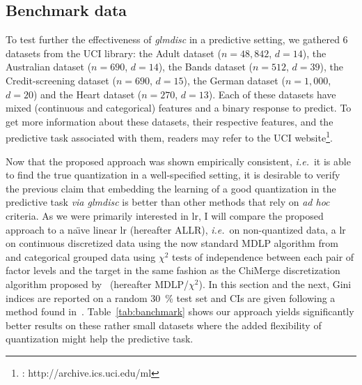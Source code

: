 \subsection{Benchmark data} \label{subsec:exp_benchmark}

To test further the effectiveness of \textit{glmdisc} in a predictive setting, we gathered 6 datasets from the UCI library: the Adult dataset ($n=48,842$, $d=14$), the Australian dataset ($n=690$, $d=14$), the Bands dataset ($n=512$, $d=39$), the Credit-screening dataset ($n=690$, $d=15$), the German dataset ($n=1,000$, $d=20$) and the Heart dataset ($n=270$, $d=13$). Each of these datasets have mixed (continuous and categorical) features and a binary response to predict. To get more information about these datasets, their respective features, and the predictive task associated with them, readers may refer to the UCI website\footnote{\cite{Dua:2017} : http://archive.ics.uci.edu/ml}.

Now that the proposed approach was shown empirically consistent, \textit{i.e.}\ it is able to find the true quantization in a well-specified setting, it is desirable to verify the previous claim that embedding the learning of a good quantization in the predictive task \textit{via glmdisc} is better than other methods that rely on \textit{ad hoc} criteria. As we were primarily interested in \gls{lr}, I will compare the proposed approach to a na\"{\i}ve linear \gls{lr} (hereafter ALLR), \textit{i.e.}\ on non-quantized data, a \gls{lr} on continuous discretized data using the now standard MDLP algorithm from~\cite{fayyad1993multi} and categorical grouped data using $\chi^2$ tests of independence between each pair of factor levels and the target in the same fashion as the ChiMerge discretization algorithm proposed by~\cite{kerber1992chimerge} (hereafter MDLP/$\chi^2$). In this section and the next, Gini indices are reported on a random 30~\% test set and CIs are given following a method found in~\cite{sun2014fast}. Table~\ref{tab:banchmark} shows our approach yields significantly better results on these rather small datasets where the added flexibility of quantization might help the predictive task.

